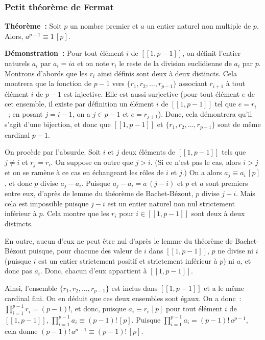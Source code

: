 \subsubsection{Petit théorème de Fermat}

\noindent\textbf{Théorème :} Soit $p$ un nombre premier et $a$ un entier naturel non multiple de $p$. 
Alors, $a^{p-1} \equiv 1 \, [p]$.

\medskip

\noindent\textbf{Démonstration :} Pour tout élément $i$ de $[\![1, p-1]\!]$, on définit l'entier naturels $a_i$ par $a_i = i a$ et on note $r_i$ le reste de la division euclidienne de $a_i$ par $p$. 
Montrons d'abords que les $r_i$ ainsi définis sont deux à deux distincts. 
Cela montrera que la fonction de $p-1$ vers $\lbrace r_1, r_2, \dots, r_{p-1} \rbrace$ associant $r_{i+1}$ à tout élément $i$ de $p-1$ est injective.
Elle est aussi surjective (pour tout élément $e$ de cet ensemble, il existe par définition un élément $i$ de $[\![1,p-1]\!]$ tel que $e = r_i$ ; en posant $j = i-1$, on a $j \in p-1$ et $e = r_{j+1}$). 
Donc, cela démontrera qu'il s'agit d'une bijection, et donc que $[\![1, p-1]\!]$ et $\lbrace r_1, r_2, \dots, r_{p-1} \rbrace$ sont de même cardinal $p-1$.

On procède par l'absurde. 
Soit $i$ et $j$ deux éléments de $[\![1, p-1]\!]$ tels que $j \neq i$ et $r_j = r_i$. 
On suppose en outre que $j > i$. 
(Si ce n'est pas le cas, alors $i > j$ et on se ramène à ce cas en échangeant les rôles de $i$ et $j$.)
On a alors $a_j \equiv a_i \, [p]$, et donc $p$ divise $a_j - a_i$. 
Puisque $a_j - a_i = a \, (j-i)$ et $p$ et $a$ sont premiers entre eux, d'après de lemme du théorème de Bachet-Bézout, $p$ divise $j-i$. 
Mais cela est impossible puisque $j-i$ est un entier naturel non nul strictement inférieur à $p$. 
Cela montre que les $r_i$ pour $i \in [\![1, p-1]\!]$ sont deux à deux distincts. 

En outre, aucun d'eux ne peut être nul d'après le lemme du théorème de Bachet-Bézout puisque, pour chacune des valeur de $i$ dans $[\![1,p-1]\!]$, $p$ ne divise ni $i$ (puisque $i$ est un entier strictement positif et strictement inférieur à $p$) ni $a$, et donc pas $a_i$.
Donc, chacun d'eux appartient à $[\![1, p-1]\!]$.

Ainsi, l'ensemble $\lbrace r_1, r_2, \dots, r_{p-1} \rbrace$ est inclus dans $[\![1, p-1]\!]$ et a le même cardinal fini. 
On en déduit que ces deux ensembles sont égaux. 
On a donc : $\prod_{i=1}^{p-1} r_i = (p-1)!$, et donc, puisque $a_i \equiv r_i \, [p]$ pour tout élément $i$ de $[\![1, p-1]\!]$, $\prod_{i=1}^{p-1} a_i \equiv (p-1)! \, [p]$.
Puisque $\prod_{i=1}^{p-1} a_i = (p-1)! \, a^{p-1}$, cela donne $(p-1)! \, a^{p-1} \equiv (p-1)! \, [p]$.

